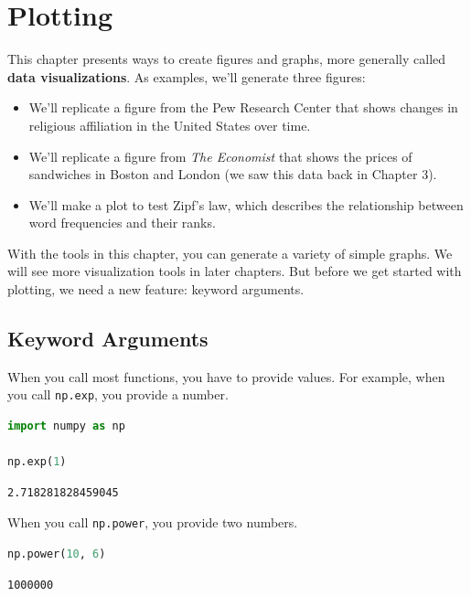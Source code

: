 \chapter{Plotting}\label{plotting}

This chapter presents ways to create figures and graphs, more generally
called \textbf{data visualizations}. As examples, we'll generate three
figures:

\begin{itemize}
\item
  We'll replicate a figure from the Pew Research Center that shows
  changes in religious affiliation in the United States over time.
\item
  We'll replicate a figure from \emph{The Economist} that shows the
  prices of sandwiches in Boston and London (we saw this data back in
  Chapter 3).
\item
  We'll make a plot to test Zipf's law, which describes the relationship
  between word frequencies and their ranks.
\end{itemize}

With the tools in this chapter, you can generate a variety of simple
graphs. We will see more visualization tools in later chapters. But
before we get started with plotting, we need a new feature: keyword
arguments.

\section{Keyword Arguments}\label{keyword-arguments}

When you call most functions, you have to provide values. For example,
when you call \passthrough{\lstinline!np.exp!}, you provide a number.

\begin{lstlisting}[language=Python,style=source]
import numpy as np

np.exp(1)
\end{lstlisting}

\begin{lstlisting}[style=output]
2.718281828459045
\end{lstlisting}

When you call \passthrough{\lstinline!np.power!}, you provide two
numbers.

\begin{lstlisting}[language=Python,style=source]
np.power(10, 6)
\end{lstlisting}

\begin{lstlisting}[style=output]
1000000
\end{lstlisting}

